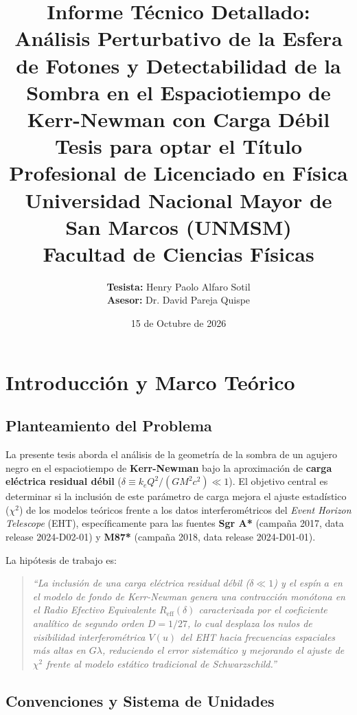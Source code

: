 \documentclass[12pt,a4paper]{article}
\title{
    \vspace{-1cm}
    \textbf{Informe Técnico Detallado: Análisis Perturbativo de la Esfera de Fotones y Detectabilidad de la Sombra en el Espaciotiempo de Kerr-Newman con Carga Débil} \\
    \large Tesis para optar el Título Profesional de Licenciado en Física \\
    \large Universidad Nacional Mayor de San Marcos (UNMSM) \\
    \large Facultad de Ciencias Físicas
}
\author{
    \textbf{Tesista:} Henry Paolo Alfaro Sotil \\
    \textbf{Asesor:} Dr. David Pareja Quispe
}
\date{15 de Octubre de 2026}
\begin{document}
\maketitle
\thispagestyle{empty}
\newpage

\tableofcontents
\newpage

\section{Introducción y Marco Teórico}

\subsection{Planteamiento del Problema}

La presente tesis aborda el análisis de la geometría de la sombra de un agujero negro en el espaciotiempo de \textbf{Kerr-Newman} bajo la aproximación de \textbf{carga eléctrica residual débil} ($\delta \equiv k_e Q^2 / (G M^2 c^2) \ll 1$). El objetivo central es determinar si la inclusión de este parámetro de carga mejora el ajuste estadístico ($\chi^2$) de los modelos teóricos frente a los datos interferométricos del \textit{Event Horizon Telescope} (EHT), específicamente para las fuentes \textbf{Sgr A*} (campaña 2017, data release 2024-D02-01) y \textbf{M87*} (campaña 2018, data release 2024-D01-01).

La hipótesis de trabajo es:

\begin{quote}
\textit{``La inclusión de una carga eléctrica residual débil ($\delta \ll 1$) y el espín $a$ en el modelo de fondo de Kerr-Newman genera una contracción monótona en el Radio Efectivo Equivalente $R_{\text{eff}}(\delta)$ caracterizada por el coeficiente analítico de segundo orden $D = 1/27$, lo cual desplaza los nulos de visibilidad interferométrica $V(u)$ del EHT hacia frecuencias espaciales más altas en $G\lambda$, reduciendo el error sistemático y mejorando el ajuste de $\chi^2$ frente al modelo estático tradicional de Schwarzschild.''}
\end{quote}

\subsection{Convenciones y Sistema de Unidades}
\end{document}
